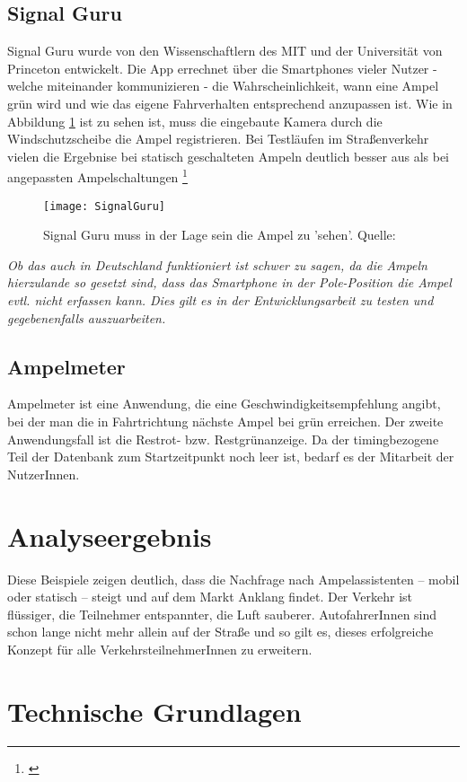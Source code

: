 \subsection{Signal Guru}
Signal Guru wurde von den Wissenschaftlern des \gls{MIT} und der Universität von Princeton entwickelt. Die App errechnet über die Smartphones vieler Nutzer - welche miteinander kommunizieren -  die Wahrscheinlichkeit, wann eine Ampel grün wird und wie das eigene Fahrverhalten entsprechend anzupassen ist. Wie in Abbildung \ref{fig:AppSignalGuru} ist zu sehen ist, muss die eingebaute Kamera durch die Windschutzscheibe die Ampel registrieren. Bei Testläufen im Straßenverkehr vielen die Ergebnise bei statisch geschalteten Ampeln deutlich besser aus als bei angepassten Ampelschaltungen \footnote{\cite{SignalGuru}} 
\begin{figure}[H]
    \centering
    \texttt{[image: SignalGuru]}
    \caption[Signal Guru]{Signal Guru muss in der Lage sein die Ampel zu 'sehen'.  Quelle: \cite{SignalGuruPaper}}
    \label{fig:AppSignalGuru}
\end{figure}
\textit{Ob das auch in Deutschland funktioniert ist schwer zu sagen, da die Ampeln hierzulande so gesetzt sind, dass das Smartphone in der Pole-Position die Ampel evtl. nicht erfassen kann. Dies gilt es in der Entwicklungsarbeit zu testen und gegebenenfalls auszuarbeiten.}
\subsection{Ampelmeter}
Ampelmeter ist eine Anwendung, die eine Geschwindigkeitsempfehlung angibt, bei der man die in Fahrtrichtung nächste Ampel bei grün erreichen. Der zweite Anwendungsfall ist die Restrot- bzw. Restgrünanzeige. Da der timingbezogene Teil der Datenbank zum Startzeitpunkt noch leer ist, bedarf es der Mitarbeit der NutzerInnen.
\section{Analyseergebnis}
Diese Beispiele zeigen deutlich, dass die Nachfrage nach Ampelassistenten -- mobil oder statisch -- steigt und auf dem Markt Anklang findet. Der Verkehr ist flüssiger, die Teilnehmer entspannter, die Luft sauberer. AutofahrerInnen sind schon lange nicht mehr allein auf der Straße und so gilt es, dieses erfolgreiche Konzept für alle VerkehrsteilnehmerInnen zu erweitern.
%
%
%
%
\section{Technische Grundlagen}
